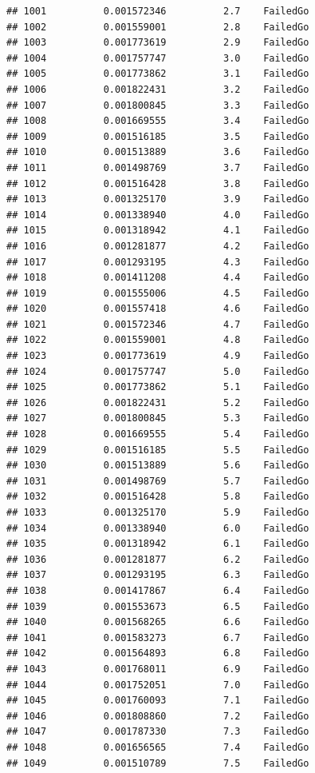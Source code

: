 \documentclass[
]{article}
\begin{document}
\begin{verbatim}
## 1001          0.001572346          2.7    FailedGo
## 1002          0.001559001          2.8    FailedGo
## 1003          0.001773619          2.9    FailedGo
## 1004          0.001757747          3.0    FailedGo
## 1005          0.001773862          3.1    FailedGo
## 1006          0.001822431          3.2    FailedGo
## 1007          0.001800845          3.3    FailedGo
## 1008          0.001669555          3.4    FailedGo
## 1009          0.001516185          3.5    FailedGo
## 1010          0.001513889          3.6    FailedGo
## 1011          0.001498769          3.7    FailedGo
## 1012          0.001516428          3.8    FailedGo
## 1013          0.001325170          3.9    FailedGo
## 1014          0.001338940          4.0    FailedGo
## 1015          0.001318942          4.1    FailedGo
## 1016          0.001281877          4.2    FailedGo
## 1017          0.001293195          4.3    FailedGo
## 1018          0.001411208          4.4    FailedGo
## 1019          0.001555006          4.5    FailedGo
## 1020          0.001557418          4.6    FailedGo
## 1021          0.001572346          4.7    FailedGo
## 1022          0.001559001          4.8    FailedGo
## 1023          0.001773619          4.9    FailedGo
## 1024          0.001757747          5.0    FailedGo
## 1025          0.001773862          5.1    FailedGo
## 1026          0.001822431          5.2    FailedGo
## 1027          0.001800845          5.3    FailedGo
## 1028          0.001669555          5.4    FailedGo
## 1029          0.001516185          5.5    FailedGo
## 1030          0.001513889          5.6    FailedGo
## 1031          0.001498769          5.7    FailedGo
## 1032          0.001516428          5.8    FailedGo
## 1033          0.001325170          5.9    FailedGo
## 1034          0.001338940          6.0    FailedGo
## 1035          0.001318942          6.1    FailedGo
## 1036          0.001281877          6.2    FailedGo
## 1037          0.001293195          6.3    FailedGo
## 1038          0.001417867          6.4    FailedGo
## 1039          0.001553673          6.5    FailedGo
## 1040          0.001568265          6.6    FailedGo
## 1041          0.001583273          6.7    FailedGo
## 1042          0.001564893          6.8    FailedGo
## 1043          0.001768011          6.9    FailedGo
## 1044          0.001752051          7.0    FailedGo
## 1045          0.001760093          7.1    FailedGo
## 1046          0.001808860          7.2    FailedGo
## 1047          0.001787330          7.3    FailedGo
## 1048          0.001656565          7.4    FailedGo
## 1049          0.001510789          7.5    FailedGo

\end{verbatim}
\end{document}
